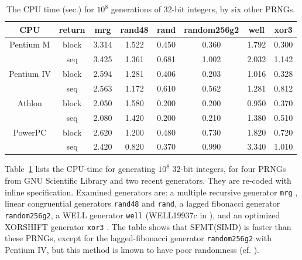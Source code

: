 \documentclass[acmnow]{acmtrans2m}
\begin{document}
\begin{table}
\begin{center}
\begin{tabular}{|c|c||c|c|c|c|c|c|}
\hline
CPU & return & mrg & rand48 & rand & random256g2 & well & xor3  \\ \hline \hline
Pentium M & block & 3.314  & 1.522  & 0.450  & 0.360  & 1.792  & 0.300 \\
\cline{2-8}
 & seq & 3.425  & 1.361  & 0.681  & 1.002  & 2.032  & 1.142 \\ \hline
Pentium IV & block & 2.594  & 1.281  & 0.406  & 0.203  & 1.016  & 0.328 \\ 
\cline{2-8}
 & seq & 2.563  & 1.172  & 0.610  & 0.562  & 1.281  & 0.812 \\ \hline
Athlon & block & 2.050  & 1.580  & 0.200  & 0.200  & 0.950  & 0.370 \\ 
\cline{2-8}
 & seq & 2.080  & 1.420  & 0.200  & 0.210  & 1.380  & 0.510 \\ \hline
PowerPC & block & 2.620  & 1.200  & 0.480  & 0.730  & 1.820  & 0.720 \\ 
\cline{2-8}
 & seq & 2.420  & 0.820  & 0.370  & 0.990  & 3.340  & 1.010 \\ \hline
\end{tabular}
\end{center}
\caption{The CPU time (sec.) for $10^8$ generations of 32-bit integers,
by six other PRNGs.}\label{tab:speed-other}
\end{table}
Table~\ref{tab:speed-other} lists the CPU-time for generating
$10^8$ 32-bit integers, for four PRNGs from GNU Scientific Library
and two recent generators. 
They are re-coded with inline specification. Examined
generators are:
a multiple recursive generator {\tt mrg} \cite{MRG}, 
linear congruential generators {\tt rand48} and {\tt rand}, 
a lagged fibonacci generator {\tt random256g2},
a WELL generator {\tt well} (WELL19937c in \cite{WELL}),
and an optimized XORSHIFT generator {\tt xor3} 
\cite{XORSHIFT} \cite{XORSHIFT-MAR}.
The table shows that SFMT(SIMD) is faster than
these PRNGs, except for the lagged-fibonacci
generator {\tt random256g2} with Pentium IV,
but this method is known to
have poor randomness (cf. \cite{SUM}).
\end{document}

